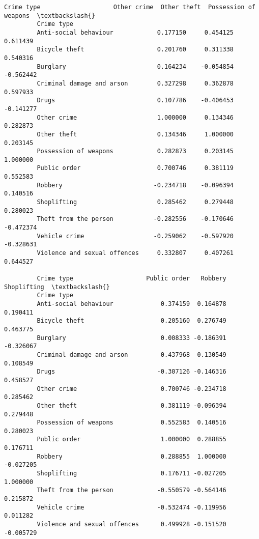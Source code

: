 \documentclass[11pt]{article}
\begin{document}
\begin{Verbatim}[commandchars=\\\{\}]
         Crime type                    Other crime  Other theft  Possession of weapons  \textbackslash{}
         Crime type                                                                      
         Anti-social behaviour            0.177150     0.454125               0.611439   
         Bicycle theft                    0.201760     0.311338               0.540316   
         Burglary                         0.164234    -0.054854              -0.562442   
         Criminal damage and arson        0.327298     0.362878               0.597933   
         Drugs                            0.107786    -0.406453              -0.141277   
         Other crime                      1.000000     0.134346               0.282873   
         Other theft                      0.134346     1.000000               0.203145   
         Possession of weapons            0.282873     0.203145               1.000000   
         Public order                     0.700746     0.381119               0.552583   
         Robbery                         -0.234718    -0.096394               0.140516   
         Shoplifting                      0.285462     0.279448               0.280023   
         Theft from the person           -0.282556    -0.170646              -0.472374   
         Vehicle crime                   -0.259062    -0.597920              -0.328631   
         Violence and sexual offences     0.332807     0.407261               0.644527   
         
         Crime type                    Public order   Robbery  Shoplifting  \textbackslash{}
         Crime type                                                          
         Anti-social behaviour             0.374159  0.164878     0.190411   
         Bicycle theft                     0.205160  0.276749     0.463775   
         Burglary                          0.008333 -0.186391    -0.326067   
         Criminal damage and arson         0.437968  0.130549     0.108549   
         Drugs                            -0.307126 -0.146316     0.458527   
         Other crime                       0.700746 -0.234718     0.285462   
         Other theft                       0.381119 -0.096394     0.279448   
         Possession of weapons             0.552583  0.140516     0.280023   
         Public order                      1.000000  0.288855     0.176711   
         Robbery                           0.288855  1.000000    -0.027205   
         Shoplifting                       0.176711 -0.027205     1.000000   
         Theft from the person            -0.550579 -0.564146     0.215872   
         Vehicle crime                    -0.532474 -0.119956     0.011282   
         Violence and sexual offences      0.499928 -0.151520    -0.005729   
         

\end{Verbatim}
\end{document}
